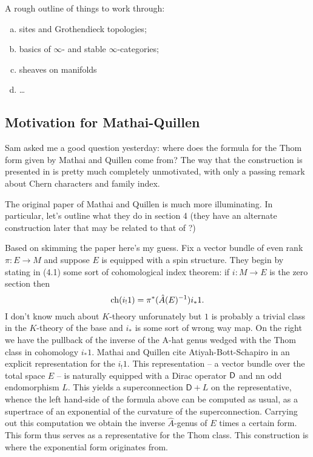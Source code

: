 \documentclass{amsart}
\begin{document}
A rough outline of things to work through:
\begin{enumerate}[(a)]
    \item sites and Grothendieck topologies;
    \item basics of $\infty$- and stable $\infty$-categories;
    \item sheaves on manifolds
    \item \ldots
\end{enumerate}

\subsection{Motivation for Mathai-Quillen}

Sam asked me a good question yesterday: where does the formula for the Thom form given
by Mathai and Quillen come from? The way that the construction is presented in
\cite{bgv} is pretty much completely unmotivated, with only a passing remark about
Chern characters and family index.

The original paper of Mathai and Quillen is much more illuminating. In particular,
let's outline what they do in section 4 (they have an alternate construction later
that may be related to that of \cite{bgv}?)

Based on skimming the paper here's my guess. Fix a vector bundle of even rank
$\pi:E\to M$ and suppose $E$ is equipped with a spin structure. 
They begin by stating in (4.1) some sort of cohomological index theorem:
if $i:M\to E$ is the zero section then
\begin{equation*}
    \operatorname{ch}(i_!1) = \pi^*(\hat A(E)^{-1})i_*1.
\end{equation*}
I don't know much about $K$-theory unforunately but $1$ is probably a trivial class
in the $K$-theory of the base and $i_*$ is some sort of wrong way map. On the right
we have the pullback of the inverse of the A-hat genus wedged with the Thom class
in cohomology $i_*1$. Mathai and Quillen cite Atiyah-Bott-Schapiro
in an explicit representation for the $i_!1$. This representation -- a vector bundle
over the total space $E$ -- is naturally equipped with a Dirac operator $\sf D$ and
nn odd endomorphism $L$. This yields a superconnection $\mathsf{D}+L$ on the representative,
whence the left hand-side of the formula above can be computed as usual, as a supertrace
of an exponential of the curvature of the superconnection. Carrying out this computation
we obtain the inverse $\hat A$-genus of $E$ times a certain form. This form thus serves
as a representative for the Thom class. This construction is where the exponential form
originates from.
\end{document}
